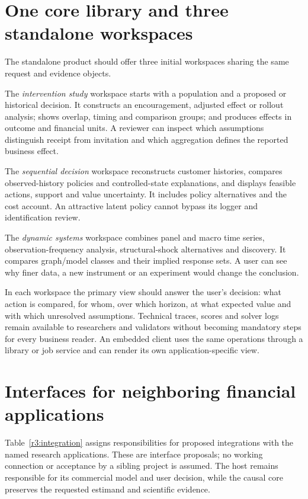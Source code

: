 \section{One core library and three standalone workspaces}
\label{r3:workspaces}

The standalone product should offer three initial workspaces sharing
the same request and evidence objects.

The \emph{intervention study} workspace starts with a population and a
proposed or historical decision. It constructs an encouragement, adjusted
effect or rollout analysis; shows overlap, timing and comparison groups;
and produces effects in outcome and financial units. A reviewer can
inspect which assumptions distinguish receipt from invitation and which
aggregation defines the reported business effect.

The \emph{sequential decision} workspace reconstructs customer histories,
compares observed-history policies and controlled-state explanations,
and displays feasible actions, support and value uncertainty. It
includes policy alternatives and the cost account. An attractive latent
policy cannot bypass its logger and identification review.

The \emph{dynamic systems} workspace combines panel and macro time
series, observation-frequency analysis, structural-shock alternatives
and discovery. It compares graph/model classes and their implied
response sets. A user can see why finer data, a new instrument or an
experiment would change the conclusion.

In each workspace the primary view should answer the user's decision:
what action is compared, for whom, over which horizon, at what expected
value and with which unresolved assumptions. Technical traces, scores
and solver logs remain available to researchers and validators without
becoming mandatory steps for every business reader. An embedded client
uses the same operations through a library or job service and can render
its own application-specific view.

\section{Interfaces for neighboring financial applications}
\label{r3:integration-contract}

Table~\ref{r3:integration} assigns responsibilities for proposed
integrations with the named research applications. These are interface
proposals; no working connection or acceptance by a sibling project
is assumed. The host remains responsible for its commercial model and
user decision, while the causal core preserves the requested estimand
and scientific evidence.

